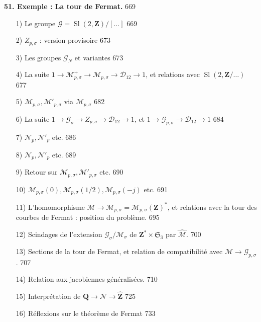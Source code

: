\noindent \textbf{51. Exemple : La tour de Fermat.} \hfill 669
\begin{enumerate}
\item[1)] Le groupe $\mathcal{G} = \operatorname{Sl}(2, \mathbf{Z}) / [\dots]$ \hfill 669
\item[2)] $Z_{p,\sigma}$ : version provisoire \hfill 673
\item[3)] Les groupes $\mathcal{G}_N$ et variantes \hfill 673
\item[4)] La suite $1 \to \mathcal{M}_{p,\sigma}^+ \to \mathcal{M}_{p,\sigma} \to \mathcal{D}_{12} \to 1$, et relations avec $\operatorname{Sl}(2, \mathbf{Z}/ \dots)$ \hfill 677
\item[5)] $\mathcal{M}_{p,\sigma}, \mathcal{M}'_{p,\sigma}$ via $\mathcal{M}_{p,\sigma}$ \hfill 682
\item[6)] La suite $1 \to \mathcal{G}_\sigma \to Z_{p,\sigma} \to \mathcal{D}_{12} \to 1$, et $1 \to \mathcal{G}_{p,\sigma} \to \mathcal{D}_{12} \to 1$ \hfill 684
\item[7)] $\mathcal{N}_p, \mathcal{N}'_p$ etc. \hfill 686
\item[8)] $\mathcal{N}_p, \mathcal{N}'_p$ etc. \hfill 689
\item[9)] Retour sur $\mathcal{M}_{p,\sigma}, \mathcal{M}'_{p,\sigma}$ etc. \hfill 690
\item[10)] $\mathcal{M}_{p,\sigma}(0), \mathcal{M}_{p,\sigma}(1/2), \mathcal{M}_{p,\sigma}(-j)$ etc. \hfill 691
\item[11)] L'homomorphisme $\mathcal{M} \to \mathcal{M}_{p,\sigma} = \mathcal{M}_{p,\sigma}(\mathbf{Z})^*$, et relations avec la tour des courbes de Fermat : position du problème. \hfill 695
\item[12)] Scindages de l'extension $\mathcal{G}_\sigma / \mathcal{M}_\sigma$ de $\mathbf{Z}^* \times \mathfrak{S}_3$ par $\hat{\mathcal{M}}$. \hfill 700
\item[13)] Sections de la tour de Fermat, et relation de compatibilité avec $\mathcal{M} \to \mathcal{G}_{p,\sigma}$. \hfill 707
\item[14)] Relation aux jacobiennes généralisées. \hfill 710
\item[15)] Interprétation de $\mathbf{Q} \to \mathcal{N} \to \hat{\mathbf{Z}}$ \hfill 725
\item[16)] Réflexions sur le théorème de Fermat \hfill 733
\end{enumerate}

\newpage


